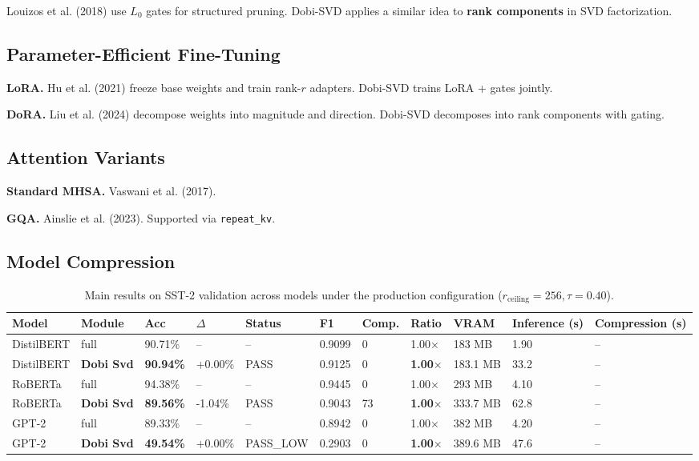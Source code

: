 Louizos et al. (2018) use $L_0$ gates for structured pruning. Dobi-SVD 
applies a similar idea to \textbf{rank components} in SVD factorization.

\subsection{Parameter-Efficient Fine-Tuning}

\textbf{LoRA.} Hu et al. (2021) freeze base weights and train rank-$r$ adapters. 
Dobi-SVD trains LoRA + gates jointly.

\textbf{DoRA.} Liu et al. (2024) decompose weights into magnitude and direction. 
Dobi-SVD decomposes into rank components with gating.

\subsection{Attention Variants}

\textbf{Standard MHSA.} Vaswani et al. (2017).

\textbf{GQA.} Ainslie et al. (2023). Supported via \texttt{repeat\_kv}.

\subsection{Model Compression}

\begin{table}[t]
\centering
\small
\begin{tabular}{lllllllllll}
\toprule
\textbf{Model} & \textbf{Module} & \textbf{Acc} & \textbf{$\Delta$} & \textbf{Status} & \textbf{F1} & \textbf{Comp.} & \textbf{Ratio} & \textbf{VRAM} & \textbf{Inference (s)} & \textbf{Compression (s)} \\
\midrule
DistilBERT & full & 90.71\% & -- & -- & 0.9099 & 0 & 1.00$\times$ & 183 MB & 1.90 & -- \\
DistilBERT & \textbf{Dobi Svd} & \textbf{90.94\%} & +0.00\% & PASS & 0.9125 & 0 & \textbf{1.00$\times$} & 183.1 MB & 33.2 & -- \\
RoBERTa & full & 94.38\% & -- & -- & 0.9445 & 0 & 1.00$\times$ & 293 MB & 4.10 & -- \\
RoBERTa & \textbf{Dobi Svd} & \textbf{89.56\%} & -1.04\% & PASS & 0.9043 & 73 & \textbf{1.00$\times$} & 333.7 MB & 62.8 & -- \\
GPT-2 & full & 89.33\% & -- & -- & 0.8942 & 0 & 1.00$\times$ & 382 MB & 4.20 & -- \\
GPT-2 & \textbf{Dobi Svd} & \textbf{49.54\%} & +0.00\% & PASS_LOW & 0.2903 & 0 & \textbf{1.00$\times$} & 389.6 MB & 47.6 & -- \\
\bottomrule
\end{tabular}
\caption{Main results on SST-2 validation across models under the production configuration ($r_{\mathrm{ceiling}}=256, \tau=0.40$).}
\label{tab:main_sst2}
\end{table}

